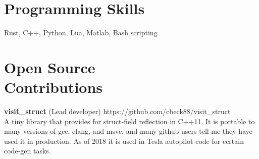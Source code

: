 \documentclass[margin,line]{resume}
\begin{document}
\begin{resume}


       


    \section{\mysidestyle Programming Skills} 

    Rust, C++, Python, Lua, Matlab, Bash scripting

    \section{\mysidestyle Open Source\\Contributions}

    \textbf{visit\_struct} (Lead developer) \hfill https://github.com/cbeck88/visit\_struct \\
    A tiny library that provides for struct-field reflection in C++11. It is portable to many versions of gcc, clang, and msvc,
    and many github users tell me they have used it in production. As of 2018 it is used in Tesla autopilot code for certain code-gen tasks.


\end{resume}
\end{document}
